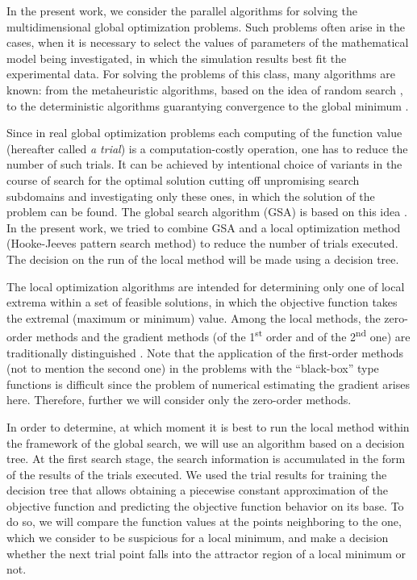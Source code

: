 \documentclass{svproc}
\begin{document}
In the present work, we consider the parallel algorithms for solving the multidimensional global optimization problems. Such problems often arise in the cases, when it is necessary to select the values  of parameters of the mathematical model being investigated, in which the simulation results best fit the experimental data. For solving the problems of this class, many algorithms are known: from the metaheuristic algorithms, based on the  idea of random search \cite{fio_bib1,fio_bib2,fio_bib3}, to the deterministic algorithms guarantying convergence to the global minimum \cite{fio_bib4,fio_bib5,fio_bib6}.  

Since in real global optimization problems each computing of the function value (hereafter called  \textit{a trial}) is a computation-costly operation, one has to reduce the number of such trials. It  can be achieved by intentional choice of variants in the course of search for the optimal solution cutting  off unpromising search subdomains and investigating only these ones, in which the solution of the  problem can be found. The global search algorithm (GSA) is based on this idea \cite{fio_bib7}. In  the present work, we tried to combine GSA and a local optimization method (Hooke-Jeeves pattern search method) to reduce the number of trials executed. The decision on the run of the local method will be made using a decision tree.

The local optimization algorithms are intended for determining only one of local extrema within a set  of feasible solutions, in which the objective function takes the extremal (maximum or minimum) value.  Among the local methods,  the zero-order methods and the gradient methods (of the 1\textsuperscript{st} order and of the  2\textsuperscript{nd} one) are traditionally distinguished \cite{fio_bib8,fio_bib9}. Note that the application of the first-order methods (not to mention the second one) in the problems  with the ``black-box'' type functions is difficult since the problem of numerical estimating the gradient arises here. Therefore, further we will consider only the zero-order methods. 

In order to determine,  at which moment it is best to run the local method within the framework of the  global search, we will use an algorithm based on a decision tree. At the first search stage, the search information is accumulated in the form of the results of the trials  executed. We used the trial results for training the decision tree that allows obtaining a piecewise constant approximation of the objective function and predicting the objective function behavior on its base.  To do so, we will compare the function values at the points neighboring to the one, which we consider  to be suspicious for a local minimum, and make a decision  whether the next trial point falls into the attractor region of a local minimum or not.
\end{document}
